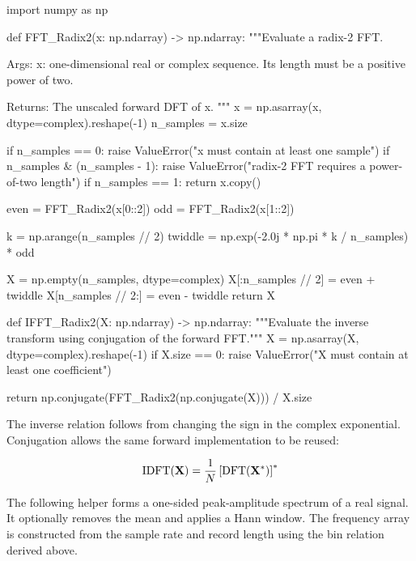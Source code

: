 \begin{python}
import numpy as np


def FFT_Radix2(x: np.ndarray) -> np.ndarray:
    """Evaluate a radix-2 FFT.

    Args:
        x: one-dimensional real or complex sequence. Its length must be a
           positive power of two.

    Returns:
        The unscaled forward DFT of x.
    """
    x = np.asarray(x, dtype=complex).reshape(-1)
    n_samples = x.size

    if n_samples == 0:
        raise ValueError("x must contain at least one sample")
    if n_samples & (n_samples - 1):
        raise ValueError("radix-2 FFT requires a power-of-two length")
    if n_samples == 1:
        return x.copy()

    even = FFT_Radix2(x[0::2])
    odd = FFT_Radix2(x[1::2])

    k = np.arange(n_samples // 2)
    twiddle = np.exp(-2.0j * np.pi * k / n_samples) * odd

    X = np.empty(n_samples, dtype=complex)
    X[:n_samples // 2] = even + twiddle
    X[n_samples // 2:] = even - twiddle
    return X


def IFFT_Radix2(X: np.ndarray) -> np.ndarray:
    """Evaluate the inverse transform using conjugation of the forward FFT."""
    X = np.asarray(X, dtype=complex).reshape(-1)
    if X.size == 0:
        raise ValueError("X must contain at least one coefficient")

    return np.conjugate(FFT_Radix2(np.conjugate(X))) / X.size
\end{python}

The inverse relation follows from changing the sign in the complex exponential.
Conjugation allows the same forward implementation to be reused:

\begin{equation}
    \operatorname{IDFT}(\mathbf{X}) =
    \frac{1}{N}\left[\operatorname{DFT}(\mathbf{X}^*)\right]^*
\end{equation}

The following helper forms a one-sided peak-amplitude spectrum of a real signal.
It optionally removes the mean and applies a Hann window. The frequency array is
constructed from the sample rate and record length using the bin relation derived
above.

